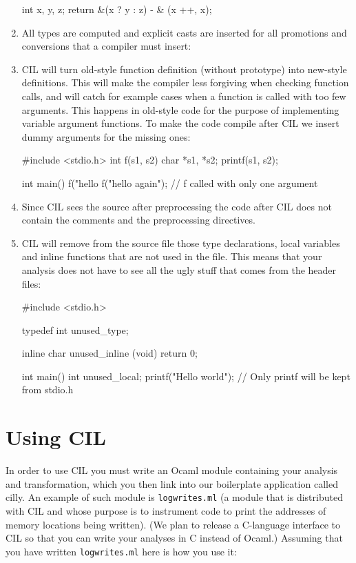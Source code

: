 \documentclass{article}
\def\t#1{{\tt #1}}
\begin{document}
\begin{enumerate}
\begin{cilcode}[local]
   int x, y, z;
   return &(x ? y : z) - & (x ++, x);
\end{cilcode}

\item All types are computed and explicit casts are inserted for all
promotions and conversions that a compiler must insert:

\item CIL will turn old-style function definition (without prototype) into
new-style definitions. This will make the compiler less forgiving when
checking function calls, and will catch for example cases when a function is
called with too few arguments. This happens in old-style code for the purpose
of implementing variable argument functions. To make the code compile after
CIL we insert dummy arguments for the missing ones:
\begin{cilcode}[global]
#include <stdio.h>
int f(s1, s2) char *s1, *s2; {
  printf(s1, s2);
}

int main() {
    f("hello %
    f("hello again\n"); // f called with only one argument
}
\end{cilcode}
 
\item Since CIL sees the source after preprocessing the code after CIL does
not contain the comments and the preprocessing directives.

\item CIL will remove from the source file those type declarations, local
variables and inline functions that are not used in the file. This means that
your analysis does not have to see all the ugly stuff that comes from the
header files: 
\begin{cilcode}[global]
#include <stdio.h>

typedef int unused_type;

inline char unused_inline (void) { return 0; }

int main() {
  int unused_local;
  printf("Hello world\n"); // Only printf will be kept from stdio.h     
}
\end{cilcode}

\end{enumerate}

\section{Using CIL}\label{sec-cil}
 
 In order to use CIL you must write an Ocaml module containing your analysis
and transformation, which you then link into our boilerplate application
called cilly. An example of such module is \t{logwrites.ml} (a module that is
distributed with CIL and whose purpose is to instrument code to print the
addresses of memory locations being written). (We plan to release a C-language
interface to CIL so that you can write your analyses in C instead of Ocaml.)
Assuming that you have written \t{logwrites.ml} here is how you use it: 
\end{document}
